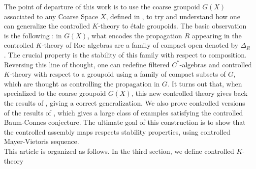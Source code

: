 The point of departure of this work is to use the coarse groupoid $G(X)$ associated to any Coarse Space $X$, defined in \cite{SkTuYu}, to try and understand how one can generalize the controlled $K$-theory to étale groupoids. The basic observation is the following : in $G(X)$, what encodes the propagation $R$ appearing in the controlled $K$-theory of Roe algebras are a family of compact open denoted by $\overline \Delta_R$. The crucial property is the stability of this family with respect to composition. Reversing this line of thought, one can redefine filtered $C^*$-algebras and controlled $K$-theory with respect to a groupoid using a family of compact subsets of $G$, which are thought as controlling the propagation in $G$. It turns out that, when specialized to the coarse groupoid $G(X)$, this new controlled theory gives back the results of \cite{OY2}, giving a correct generalization. We also prove controlled versions of the results of \cite{SkTuYu}, which gives a large class of examples satisfying the controlled Baum-Connes conjecture. The ultimate goal of this construction is to show that the controlled assembly maps respects stability properties, using controlled Mayer-Vietoris sequence.\\

This article is organized as follows. In the third section, we define controlled $K$-theory 

   
